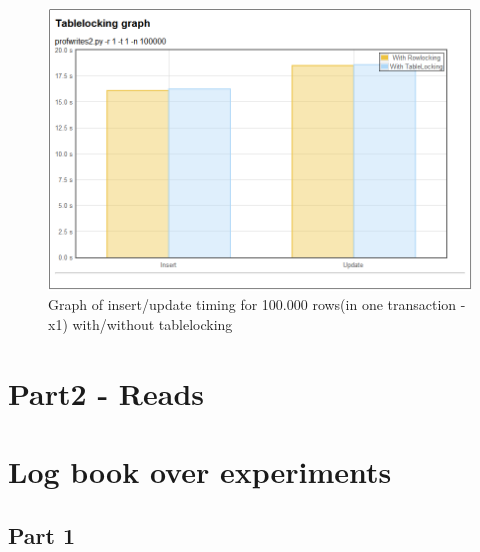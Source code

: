 \begin{figure}
  \centering
  \includegraphics[width=12cm]{assignment2/tl}
  \caption[Insert/update performance -Table locking]{Graph of insert/update timing for 100.000 rows(in one
  transaction -x1) with/without tablelocking}\label{fig:part1btl}
\end{figure}

\chapter{Part2 - Reads}


\chapter{Log book over experiments}

\section{Part 1}

